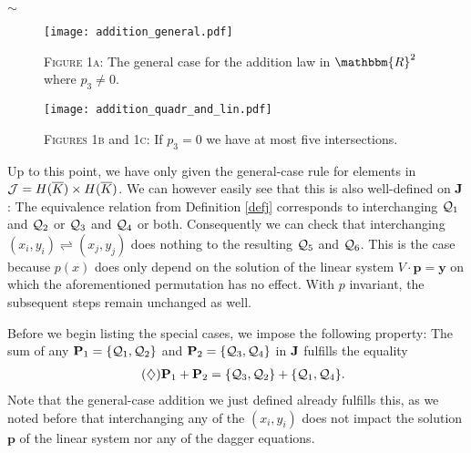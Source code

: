 \documentclass[english,11pt,a4paper]{article}
\begin{document}
\begin{center}
$\sim$
\end{center}


\begin{figure}[ht!]
	\fline
	\begin{center}
		\vspace{1mm}
		\texttt{[image: addition\_general.pdf]}

		{\scshape Figure 1a}: The general case for the addition law in $\mathbbm{R}^2$ where $p_3 \neq 0$.

		\vspace{1mm}

		\texttt{[image: addition\_quadr\_and\_lin.pdf]}

		{\scshape Figures 1b} and {\scshape 1c}: If $p_3 = 0$ we have at most five intersections.
	\end{center}
	\vspace{-1.5mm}
	\fline
\end{figure}


\begin{remark}
	Up to this point, we have only given the general-case rule for elements in $\mathcal{J}=H(\overline K) \times H(\overline K)$. We can however easily see that this is also well-defined on $\mathbf{J}$: The equivalence relation from Definition \ref{defj} corresponds to interchanging $\mathcal{Q}_1$ and $\mathcal{Q}_2$ or $\mathcal{Q}_3$ and $\mathcal{Q}_4$ or both.
	Consequently we can check that interchanging $(x_i,y_i) \rightleftharpoons (x_j,y_j)$ does nothing to the resulting $\mathcal{Q}_5$ and $\mathcal{Q}_6$. This is the case because $p(x)$ does only depend on the solution of the linear system $V \cdot \mathbf{p} = \mathbf{y}$ on which the aforementioned permutation has no effect. With $p$ invariant, the subsequent steps remain unchanged as well.
\end{remark}




Before we begin listing the special cases, we impose the following property: The sum of any $\mathbf{P}_1 = \{\mathcal{Q}_1,\mathcal{Q}_2\}$ and $\mathbf{P}_2 = \{\mathcal{Q}_3,\mathcal{Q}_4\}$ in $\mathbf{J}$ fulfills the equality
\begin{align*}
	\tag{$\diamondsuit$} \label{switch} \mathbf{P}_1 + \mathbf{P}_2 &= \{\mathcal{Q}_3,\mathcal{Q}_2\} + \{\mathcal{Q}_1,\mathcal{Q}_4\}.
\end{align*}
Note that the general-case addition we just defined already fulfills this, as we noted before that interchanging any of the $(x_i, y_i)$ does not impact the solution $\mathbf{p}$ of the linear system nor any of the dagger equations.
\end{document}
